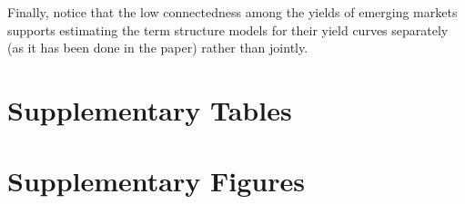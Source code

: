 \begin{appendices}

Finally, notice that the low connectedness among the yields of emerging markets supports estimating the term structure models for their yield curves separately (as it has been done in the paper) rather than jointly.


\renewcommand{\thetable}{\thesection.\arabic{table}}
\renewcommand\thefigure{\thesection.\arabic{figure}}
\section{Supplementary Tables} \label{sec:AppTables}
\setcounter{table}{0}


\section{Supplementary Figures} \label{sec:AppFigures}
\setcounter{figure}{0}

\begin{landscape}
	
	
	
	
\end{landscape}





\begin{landscape}
	\newpage
\end{landscape}

\end{appendices}